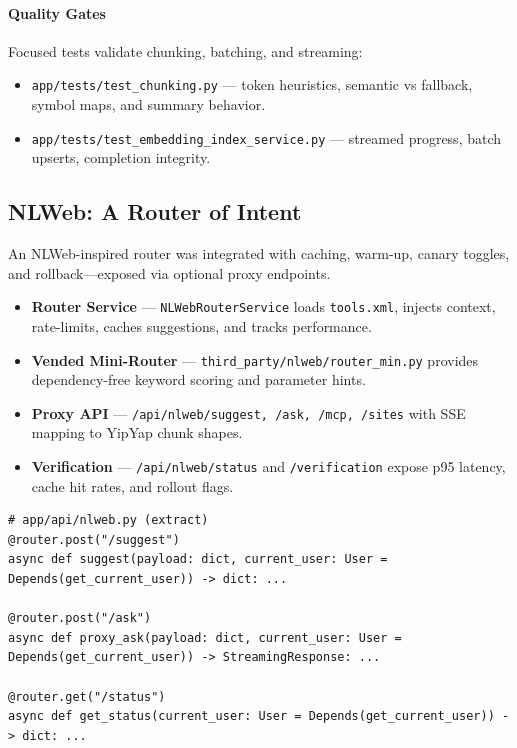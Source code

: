 \documentclass[11pt]{article}
\begin{document}
\paragraph{Quality Gates}
Focused tests validate chunking, batching, and streaming:

\begin{itemize}
  \item \texttt{app/tests/test\_chunking.py} — token heuristics, semantic vs fallback, symbol maps, and summary behavior.
  \item \texttt{app/tests/test\_embedding\_index\_service.py} — streamed progress, batch upserts, completion integrity.
\end{itemize}

\subsection{NLWeb: A Router of Intent}

An NLWeb-inspired router was integrated with caching, warm-up, canary toggles, and rollback—exposed via optional proxy endpoints.

\begin{itemize}
  \item \textbf{Router Service} — \texttt{NLWebRouterService} loads \texttt{tools.xml}, injects context, rate-limits, caches suggestions, and tracks performance.
  \item \textbf{Vended Mini-Router} — \texttt{third\_party/nlweb/router\_min.py} provides dependency-free keyword scoring and parameter hints.
  \item \textbf{Proxy API} — \texttt{/api/nlweb/suggest, /ask, /mcp, /sites} with SSE mapping to YipYap chunk shapes.
  \item \textbf{Verification} — \texttt{/api/nlweb/status} and \texttt{/verification} expose p95 latency, cache hit rates, and rollout flags.
\end{itemize}

\begin{lstlisting}[style=python]
# app/api/nlweb.py (extract)
@router.post("/suggest")
async def suggest(payload: dict, current_user: User = Depends(get_current_user)) -> dict: ...

@router.post("/ask")
async def proxy_ask(payload: dict, current_user: User = Depends(get_current_user)) -> StreamingResponse: ...

@router.get("/status")
async def get_status(current_user: User = Depends(get_current_user)) -> dict: ...
\end{lstlisting}
\end{document}
